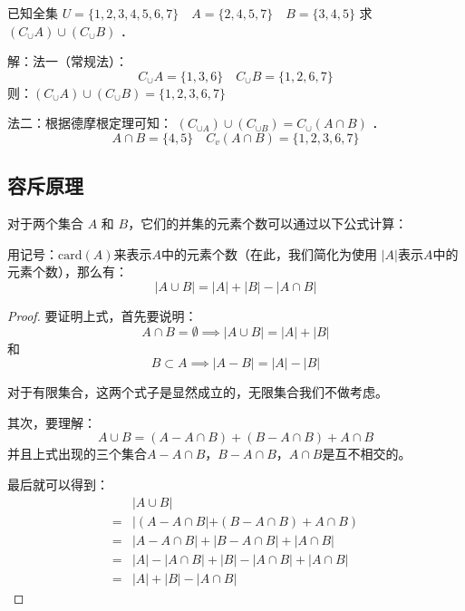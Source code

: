 \begin{example}
    已知全集 $U=\{1,2,3,4,5,6,7\} \quad A=\{2,4,5,7\} \quad B=\{3,4,5\}$
    求 $(C_\cup A) \cup(C_\cup B)$ ．
\end{example}

\begin{solution}
    解：法一（常规法）：
    $$
        C_{\cup} A=\{1,3,6\} \quad C_{\cup} B=\{1,2,6,7\}
    $$
    则：$(C_{\cup} A) \cup(C_{\cup} B)=\{1,2,3,6,7\}$

    法二：根据德摩根定理可知：
    $\left(C_{\cup A}\right) \cup\left(C_{\cup B}\right)=C_{\cup}(A \cap B)$ ．
    $$
        A \cap B=\{4,5\} \quad C_v(A \cap B)=\{1,2,3,6,7\}
    $$
\end{solution}

\subsection{容斥原理}

\begin{definition}[容斥原理]
    对于两个集合 $A$ 和 $B$，它们的并集的元素个数可以通过以下公式计算：

    用记号：$\mathrm{card}(A)$来表示$A$中的元素个数（在此，我们简化为使用 $|A|$表示$A$中的元素个数），那么有：
    $$|A\cup B| = |A|+|B|-|A\cap B|$$
\end{definition}

\begin{proof}
    要证明上式，首先要说明：
    $$A\cap B=\emptyset \implies |A\cup B| = |A|+|B|$$
    和
    $$B\subset A \implies |A-B| = |A|-|B|$$

    对于有限集合，这两个式子是显然成立的，无限集合我们不做考虑。

    其次，要理解：
    $$A\cup B = (A-A\cap B) + (B-A\cap B) + A\cap B$$
    并且上式出现的三个集合$A-A\cap B$，$B-A\cap B$，$A\cap B$是互不相交的。

    最后就可以得到：
    \begin{align*}
          & |A\cup B|                                 \\
        = & |(A-A\cap B| + (B-A\cap B) + A\cap B)     \\
        = & |A-A\cap B| + |B-A\cap B| + |A\cap B|     \\
        = & |A|-|A\cap B| + |B|-|A\cap B| + |A\cap B| \\
        = & |A|+|B|-|A\cap B|
    \end{align*}
\end{proof}

